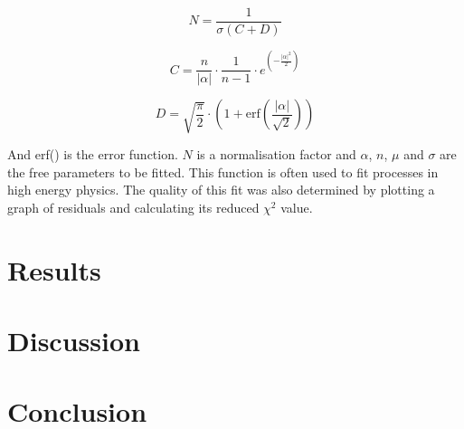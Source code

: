 \documentclass[A4sheet,12pt]{article}
\begin{document}
\begin{equation*}
    N = \frac{1}{\sigma (C+D)}
\end{equation*}

\begin{equation*}
    C = \frac{n}{\lvert \alpha \rvert}\cdot \frac{1}{n-1}\cdot e^{(-\frac{\lvert \alpha \rvert^2}{2})}
\end{equation*}

\begin{equation*}
    D = \sqrt{\frac{\pi}{2}}\cdot \left(1+\text{erf}\left(\frac{\lvert \alpha \rvert}{\sqrt{2}}\right)\right)
\end{equation*}

And erf() is the error function. $N$ is a normalisation factor and $\alpha$, $n$, $\mu$ and $\sigma$ are the free parameters to be fitted. This function is often used to fit processes in high energy physics. The quality of this fit was also determined by plotting a graph of residuals and calculating its reduced $\chi ^2$ value. \\



\section*{Results}


\section*{Discussion}


\section*{Conclusion}

\newpage
{}
\end{document}
